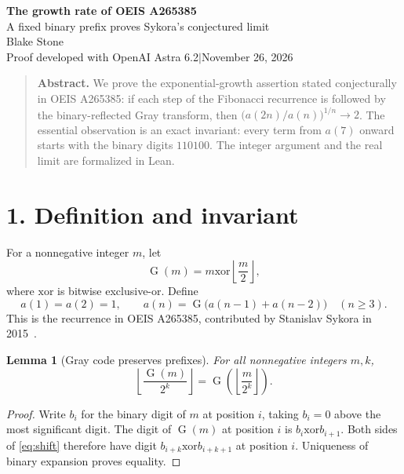\documentclass[11pt]{article}
\newtheorem{lemma}[theorem]{Lemma}
\newcommand{\G}{\operatorname{G}}
\newcommand{\xor}{\mathbin{\mathrm{xor}}}
\begin{document}
\begin{center}
{\Large\bfseries The growth rate of OEIS A265385}\\[0.2em]
{\normalsize A fixed binary prefix proves Sykora's conjectured limit}\\[0.65em]
Blake Stone\\[0.15em]
{\small Proof developed with OpenAI Astra 6.2\quad$\vert$\quad November 26, 2026}
\end{center}
\begin{quote}\small\textbf{Abstract.}
We prove the exponential-growth assertion stated conjecturally in OEIS A265385: if each step of the Fibonacci recurrence is followed by the binary-reflected Gray transform, then $\bigl(a(2n)/a(n)\bigr)^{1/n}\to2$. The essential observation is an exact invariant: every term from $a(7)$ onward starts with the binary digits $110100$. The integer argument and the real limit are formalized in Lean.
\end{quote}

\section*{1. Definition and invariant}
For a nonnegative integer $m$, let
\[
 \G(m)=m\xor\left\lfloor\frac m2\right\rfloor,
\]
where $\xor$ is bitwise exclusive-or. Define
\[
 a(1)=a(2)=1,\qquad
 a(n)=\G\bigl(a(n-1)+a(n-2)\bigr)\quad(n\ge3).
\]
This is the recurrence in OEIS A265385, contributed by Stanislav Sykora in 2015~\cite{oeis}.

\begin{lemma}[Gray code preserves prefixes]
For all nonnegative integers $m,k$,
\begin{equation}\label{eq:shift}
 \left\lfloor\frac{\G(m)}{2^k}\right\rfloor
   =\G\left(\left\lfloor\frac{m}{2^k}\right\rfloor\right).
\end{equation}
\end{lemma}
\begin{proof}
Write $b_i$ for the binary digit of $m$ at position $i$, taking $b_i=0$ above the most significant digit. The digit of $\G(m)$ at position $i$ is $b_i\xor b_{i+1}$. Both sides of \eqref{eq:shift} therefore have digit $b_{i+k}\xor b_{i+k+1}$ at position $i$. Uniqueness of binary expansion proves equality.
\end{proof}
\end{document}
